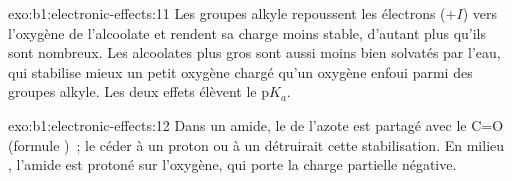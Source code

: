 \begin{solution}{exo:b1:electronic-effects:11}
Les groupes alkyle repoussent les électrons ($+I$) vers l'oxygène de
l'alcoolate et rendent sa charge moins stable, d'autant plus qu'ils sont
nombreux. Les alcoolates plus gros sont aussi moins bien solvatés par
l'eau, qui stabilise mieux un petit oxygène chargé qu'un oxygène enfoui
parmi des groupes alkyle. Les deux effets élèvent le $\mathrm{p}K_a$.
\end{solution}

\begin{solution}{exo:b1:electronic-effects:12}
Dans un amide, le  de l'azote est partagé avec le C=O
(formule )~; le céder à un proton ou à un 
détruirait cette stabilisation. En milieu , l'amide est
protoné sur l'oxygène, qui porte la charge partielle négative.
\end{solution}

